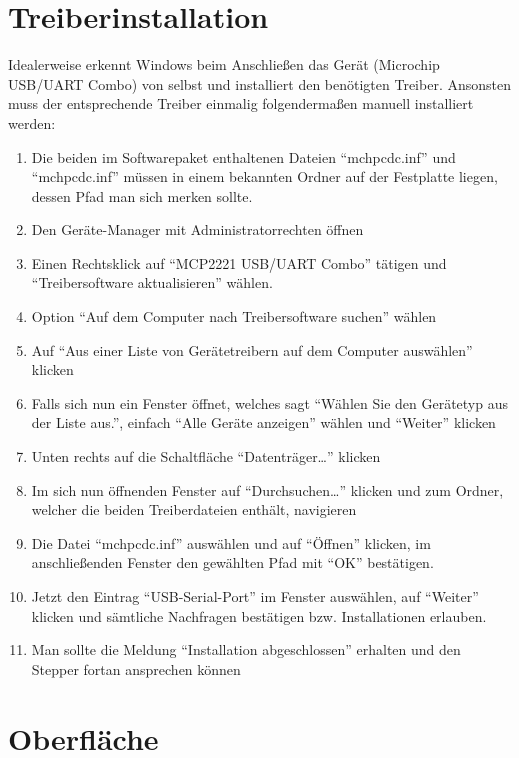 \documentclass[paper=a4, open=any]{scrbook}
\begin{document}
		\section{Treiberinstallation}
			Idealerweise erkennt Windows beim Anschließen das Gerät (Microchip USB/UART Combo) von selbst und installiert den benötigten Treiber. Ansonsten muss der entsprechende Treiber einmalig folgendermaßen manuell installiert werden:
			\begin{enumerate}
				\item Die beiden im Softwarepaket enthaltenen Dateien \enquote{mchpcdc.inf} und \enquote{mchpcdc.inf} müssen in einem bekannten Ordner auf der Festplatte liegen, dessen Pfad man sich merken sollte.
				\item Den Geräte-Manager mit Administratorrechten öffnen
				\item Einen Rechtsklick auf \enquote{MCP2221 USB/UART Combo} tätigen und \enquote{Treibersoftware aktualisieren} wählen.
				\item Option \enquote{Auf dem Computer nach Treibersoftware suchen} wählen
				\item Auf \enquote{Aus einer Liste von Gerätetreibern auf dem Computer auswählen} klicken
				\item Falls sich nun ein Fenster öffnet, welches sagt \enquote{Wählen Sie den Gerätetyp aus der Liste aus.}, einfach \enquote{Alle Geräte anzeigen} wählen und \enquote{Weiter} klicken
				\item Unten rechts auf die Schaltfläche \enquote{Datenträger\dots} klicken
				\item Im sich nun öffnenden Fenster auf \enquote{Durchsuchen\dots} klicken und zum Ordner, welcher die beiden Treiberdateien enthält, navigieren
				\item Die Datei \enquote{mchpcdc.inf} auswählen und auf \enquote{Öffnen} klicken, im anschließenden Fenster den gewählten Pfad mit \enquote{OK} bestätigen.
				\item Jetzt den Eintrag \enquote{USB-Serial-Port} im Fenster auswählen, auf \enquote{Weiter} klicken und sämtliche Nachfragen bestätigen bzw. Installationen erlauben.
				\item Man sollte die Meldung \enquote{Installation abgeschlossen} erhalten und den Stepper fortan ansprechen können
			\end{enumerate}

		\section{Oberfläche}
\end{document}
